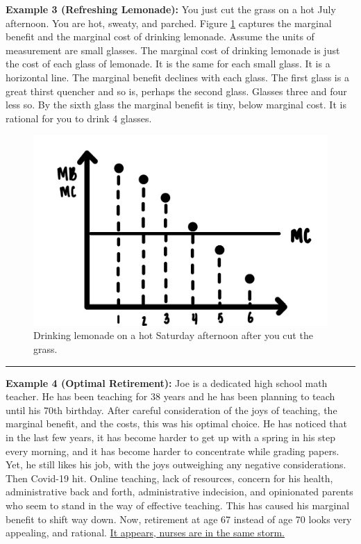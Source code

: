 \documentclass[
]{book}
\begin{document}
\textbf{Example 3 (Refreshing Lemonade):} You just cut the grass on a hot July afternoon. You are hot, sweaty, and parched. Figure \ref{fig:rationalchoice06} captures the marginal benefit and the marginal cost of drinking lemonade. Assume the units of measurement are small glasses. The marginal cost of drinking lemonade is just the cost of each glass of lemonade. It is the same for each small glass. It is a horizontal line. The marginal benefit declines with each glass. The first glass is a great thirst quencher and so is, perhaps the second glass. Glasses three and four less so. By the sixth glass the marginal benefit is tiny, below marginal cost. It is rational for you to drink 4 glasses.

\begin{figure}

{\centering \includegraphics[width=0.75\linewidth]{img/rationalchoice/fig6} 

}

\caption{Drinking lemonade on a hot Saturday afternoon after you cut the grass.}\label{fig:rationalchoice06}
\end{figure}

\begin{center}\rule{0.5\linewidth}{0.5pt}\end{center}

\textbf{Example 4 (Optimal Retirement):} Joe is a dedicated high school math teacher. He has been teaching for 38 years and he has been planning to teach until his 70th birthday. After careful consideration of the joys of teaching, the marginal benefit, and the costs, this was his optimal choice. He has noticed that in the last few years, it has become harder to get up with a spring in his step every morning, and it has become harder to concentrate while grading papers. Yet, he still likes his job, with the joys outweighing any negative considerations. Then Covid-19 hit. Online teaching, lack of resources, concern for his health, administrative back and forth, administrative indecision, and opinionated parents who seem to stand in the way of effective teaching. This has caused his marginal benefit to shift way down. Now, retirement at age 67 instead of age 70 looks very appealing, and rational. \href{https://www.npr.org/2020/11/18/936096303/nurses-are-under-pressure-as-hospitals-strain-to-meet-pandemic-demands}{It appears, nurses are in the same storm.}
\end{document}
